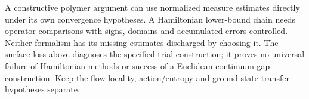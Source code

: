 \documentclass[11pt,a4paper]{article}
\begin{document}
A constructive polymer argument can use normalized measure estimates
directly under its own convergence hypotheses. A Hamiltonian lower-bound
chain needs operator comparisons with signs, domains and accumulated
errors controlled. Neither formalism has its missing estimates
discharged by choosing it. The surface loss above diagnoses the
specified trial construction; it proves no universal failure of
Hamiltonian methods or success of a Euclidean continuum gap
construction. Keep the \href{flow-jacobian-truncation-error.md}{flow
locality}, \href{large-field-action-lower-bound.md}{action/entropy} and
\href{ground-state-measure-transfer.md}{ground-state transfer}
hypotheses separate.
\end{document}
